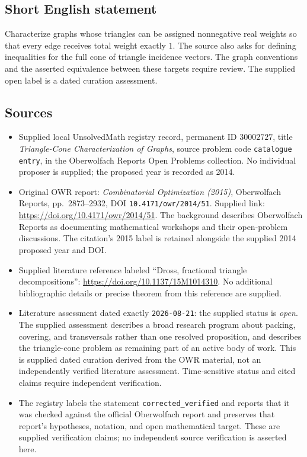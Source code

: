 \documentclass[11pt]{article}
\begin{document}
\subsection{Short English statement}
Characterize graphs whose triangles can be assigned nonnegative real weights so that every edge receives total weight exactly \(1\). The source also asks for defining inequalities for the full cone of triangle incidence vectors. The graph conventions and the asserted equivalence between these targets require review. The supplied open label is a dated curation assessment.
\subsection{Sources}
\begin{itemize}
\item Supplied local UnsolvedMath registry record, permanent ID \(30002727\), title \emph{Triangle-Cone Characterization of Graphs}, source problem code \texttt{catalogue entry}, in the Oberwolfach Reports Open Problems collection. No individual proposer is supplied; the proposed year is recorded as 2014.
\item Original OWR report: \emph{Combinatorial Optimization (2015)}, Oberwolfach Reports, pp.\ 2873--2932, DOI \texttt{10.4171/owr/2014/51}. Supplied link: \url{https://doi.org/10.4171/owr/2014/51}. The background describes Oberwolfach Reports as documenting mathematical workshops and their open-problem discussions. The citation's 2015 label is retained alongside the supplied 2014 proposed year and DOI.
\item Supplied literature reference labeled ``Dross, fractional triangle decompositions'': \url{https://doi.org/10.1137/15M1014310}. No additional bibliographic details or precise theorem from this reference are supplied.
\item Literature assessment dated exactly \texttt{2026-08-21}: the supplied status is \emph{open}. The supplied assessment describes a broad research program about packing, covering, and transversals rather than one resolved proposition, and describes the triangle-cone problem as remaining part of an active body of work. This is supplied dated curation derived from the OWR material, not an independently verified literature assessment. Time-sensitive status and cited claims require independent verification.
\item The registry labels the statement \texttt{corrected\_verified} and reports that it was checked against the official Oberwolfach report and preserves that report's hypotheses, notation, and open mathematical target. These are supplied verification claims; no independent source verification is asserted here.
\end{itemize}
\end{document}

